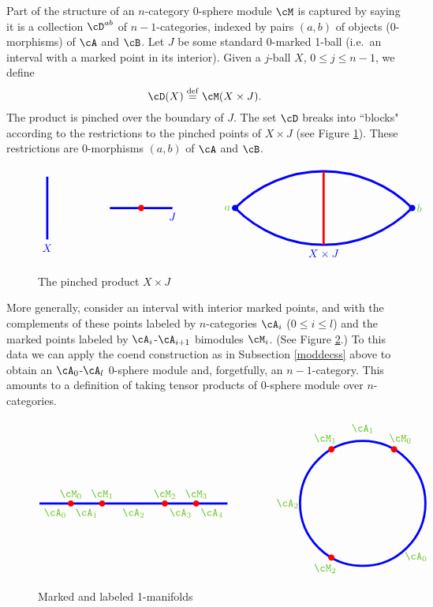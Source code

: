 \medskip

Part of the structure of an $n$-category 0-sphere module $\cM$  is captured by saying it is
a collection $\cD^{ab}$ of $n{-}1$-categories, indexed by pairs $(a, b)$ of objects (0-morphisms)
of $\cA$ and $\cB$.
Let $J$ be some standard 0-marked 1-ball (i.e.\ an interval with a marked point in its interior).
Given a $j$-ball $X$, $0\le j\le n-1$, we define
\[
	\cD(X) \deq \cM(X\times J) .
\]
The product is pinched over the boundary of $J$.
The set $\cD$ breaks into ``blocks" according to the restrictions to the pinched points of $X\times J$
(see Figure \ref{feb21b}).
These restrictions are 0-morphisms $(a, b)$ of $\cA$ and $\cB$.

\begin{figure}[!ht]
$$
\begin{tikzpicture}[blue,line width=2pt]
\draw (0,1) -- (0,-1) node[below] {$X$};

\draw (2,0) -- (4,0) node[below] {$J$};
\fill[red] (3,0) circle (0.1);

\draw (6,0) node(a) {} arc (135:90:4) node(top) {} arc (90:45:4) node(b) {} arc (-45:-90:4) node(bottom) {} arc(-90:-135:4);
\draw[red] (top.center) -- (bottom.center);
\fill (a) circle (0.1) node[left] {\color{green!50!brown} $a$};
\fill (b) circle (0.1) node[right] {\color{green!50!brown} $b$};

\path (bottom) node[below]{$X \times J$};

\end{tikzpicture}
$$
\caption{The pinched product $X\times J$}
\label{feb21b}
\end{figure}

More generally, consider an interval with interior marked points, and with the complements
of these points labeled by $n$-categories $\cA_i$ ($0\le i\le l$) and the marked points labeled
by $\cA_i$-$\cA_{i+1}$ bimodules $\cM_i$.
(See Figure \ref{feb21c}.)
To this data we can apply the coend construction as in Subsection \ref{moddecss} above
to obtain an $\cA_0$-$\cA_l$ $0$-sphere module and, forgetfully, an $n{-}1$-category.
This amounts to a definition of taking tensor products of $0$-sphere module over $n$-categories.

\begin{figure}[!ht]
$$
\begin{tikzpicture}[baseline,line width = 2pt]
\draw[blue] (0,0) -- (6,0);
\foreach \x/\n in {0.5/0,1.5/1,3/2,4.5/3,5.5/4} {
	\path (\x,0)  node[below] {\color{green!50!brown}$\cA_{\n}$};
}
\foreach \x/\n in {1/0,2/1,4/2,5/3} {
	\fill[red] (\x,0) circle (0.1) node[above] {\color{green!50!brown}$\cM_{\n}$};
}
\end{tikzpicture}
\qquad
\qquad
\begin{tikzpicture}[baseline,line width = 2pt]
\draw[blue] (0,0) circle (2);
\foreach \q/\n in {-45/0,90/1,180/2} {
	\path (\q:2.4)  node {\color{green!50!brown}$\cA_{\n}$};
}
\foreach \q/\n in {60/0,120/1,-120/2} {
	\fill[red] (\q:2) circle (0.1);
	\path (\q:2.4) node {\color{green!50!brown}$\cM_{\n}$};
}
\end{tikzpicture}
$$
\caption{Marked and labeled 1-manifolds}
\label{feb21c}
\end{figure}

